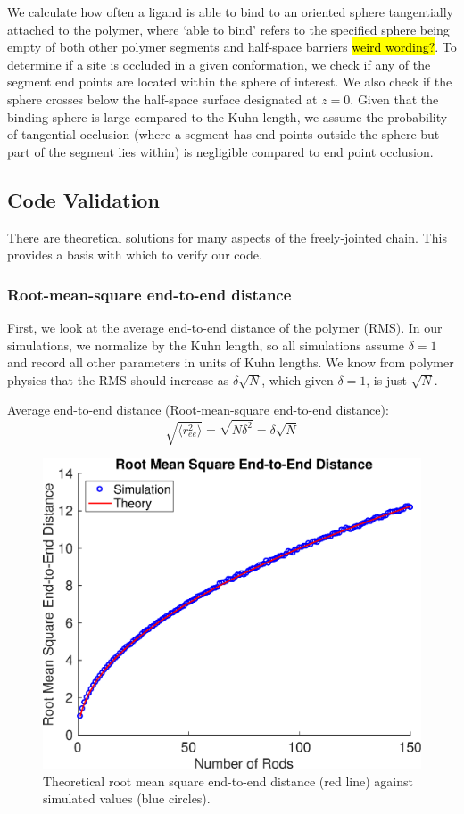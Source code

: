\documentclass[../AdvancementSummary.tex]{subfiles}
\begin{document}
We calculate how often a ligand is able to bind to an oriented sphere tangentially attached to the polymer, where `able to bind' refers to the specified sphere being empty of both other polymer segments and half-space barriers \hl{weird wording?}. To determine if a site is occluded in a given conformation, we check if any of the segment end points are located within the sphere of interest. We also check if the sphere crosses below the half-space surface designated at $z=0$. Given that the binding sphere is large compared to the Kuhn length, we assume the probability of tangential occlusion (where a segment has end points outside the sphere but part of the segment lies within) is negligible compared to end point occlusion. 


\subsection{Code Validation}
There are theoretical solutions for many aspects of the freely-jointed chain.  This provides a basis with which to verify our code.  

\subsubsection{Root-mean-square end-to-end distance}
First, we look at the average end-to-end distance of the polymer (RMS). In our simulations, we normalize by the Kuhn length, so all simulations assume $\delta = 1$ and record all other parameters in units of Kuhn lengths.  We know from polymer physics that the RMS should increase as $\delta \sqrt{N}$, which given $\delta = 1$, is just $\sqrt{N}$.

Average end-to-end distance (Root-mean-square end-to-end distance):  \cite{Reeves2011}
\begin{equation*}
\sqrt{\langle r_{ee}^2 \rangle} = \sqrt{N\delta^2} = \delta \sqrt{N}
\end{equation*}

\begin{figure}[H]
\begin{center}
\includegraphics[width=0.5\linewidth]{ModelConfirmationFigures/RMSEndtoEnd.eps}
\caption{Theoretical root mean square end-to-end distance (red line) against simulated values (blue circles). \label{fig: RMS}}
\end{center}
\end{figure}
\end{document}
